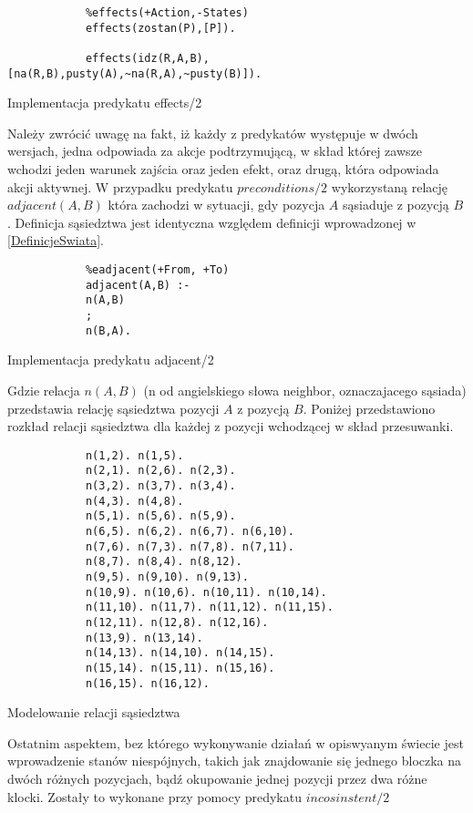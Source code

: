     \begin{listing}[H]
        \begin{verbatim}
            %effects(+Action,-States)
            effects(zostan(P),[P]).

            effects(idz(R,A,B), [na(R,B),pusty(A),~na(R,A),~pusty(B)]).
        \end{verbatim}
    \caption{Implementacja predykatu effects/2}
    \end{listing}

    Należy zwrócić uwagę na fakt, iż każdy z predykatów występuje w dwóch wersjach, jedna odpowiada za akcje podtrzymującą, w skład której 
    zawsze wchodzi jeden warunek zajścia oraz jeden efekt, oraz drugą, która odpowiada akcji aktywnej. W przypadku predykatu $preconditions/2$
    wykorzystaną relację $adjacent(A,B)$ która zachodzi w sytuacji, gdy pozycja $A$ sąsiaduje z pozycją $B$. Definicja sąsiedztwa jest identyczna 
    względem definicji wprowadzonej w \ref{DefinicjeSwiata}.

    \begin{listing}[H]
        \begin{verbatim}
            %eadjacent(+From, +To)
            adjacent(A,B) :-
            n(A,B)
            ;
            n(B,A).
        \end{verbatim}
    \caption{Implementacja predykatu adjacent/2}
    \end{listing}
    
    Gdzie relacja $n(A,B)$ (n od angielskiego słowa neighbor, oznaczajacego sąsiada)
    przedstawia relację sąsiedztwa pozycji $A$ z pozycją $B$. Poniżej przedstawiono rozkład relacji 
    sąsiedztwa dla każdej z pozycji wchodzącej w skład przesuwanki.

    \begin{listing}[H]
        \begin{verbatim}
            n(1,2). n(1,5).
            n(2,1). n(2,6). n(2,3).
            n(3,2). n(3,7). n(3,4).
            n(4,3). n(4,8).
            n(5,1). n(5,6). n(5,9).
            n(6,5). n(6,2). n(6,7). n(6,10).
            n(7,6). n(7,3). n(7,8). n(7,11).
            n(8,7). n(8,4). n(8,12).
            n(9,5). n(9,10). n(9,13).
            n(10,9). n(10,6). n(10,11). n(10,14).
            n(11,10). n(11,7). n(11,12). n(11,15).
            n(12,11). n(12,8). n(12,16). 
            n(13,9). n(13,14).
            n(14,13). n(14,10). n(14,15).
            n(15,14). n(15,11). n(15,16).
            n(16,15). n(16,12).
        \end{verbatim}
    \caption{Modelowanie relacji sąsiedztwa}
    \end{listing}
    Ostatnim aspektem, bez którego wykonywanie działań w opiswyanym świecie jest wprowadzenie stanów niespójnych, takich jak znajdowanie 
    się jednego bloczka na dwóch różnych pozycjach, bądź okupowanie jednej pozycji przez dwa różne klocki. Zostały to wykonane 
    przy pomocy predykatu $incosinstent/2$

